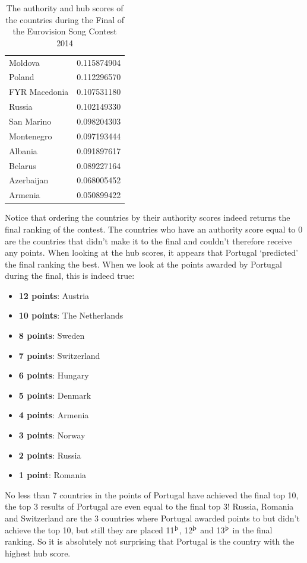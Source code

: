 \documentclass[a4paper,11pt]{report}
\begin{document}
\begin{table}[h!]
\begin{tabular}{l|r}
Moldova         & 0.115874904 \\
Poland          & 0.112296570  \\
FYR Macedonia   & 0.107531180  \\
Russia          & 0.102149330  \\
San Marino      & 0.098204303 \\
Montenegro      & 0.097193444 \\
Albania         & 0.091897617 \\
Belarus         & 0.089227164 \\
Azerbaijan      & 0.068005452 \\
Armenia         & 0.050899422
\end{tabular}

\caption{The authority and hub scores of the countries during the Final of the Eurovision Song Contest 2014}
\end{table}\label{t2014}

Notice that ordering the countries by their authority scores indeed returns the final ranking of the contest. The countries who have an
authority score equal to 0 are the countries that didn't make it to the final and couldn't therefore 
receive any points. When looking at the hub scores, it appears that Portugal `predicted' the 
final ranking the best. When we look at the points awarded by Portugal during 
the final, this is indeed true:
\begin{itemize}
  \itemsep0em

  \item \textbf{12 points}: Austria
\item \textbf{10 points}: The Netherlands
\item \textbf{8 points}: Sweden
\item \textbf{7 points}: Switzerland	
\item \textbf{6 points}: Hungary
\item \textbf{5 points}: Denmark
\item \textbf{4 points}: Armenia	
\item \textbf{3 points}: Norway
\item \textbf{2 points}: Russia
\item \textbf{1 point}: Romania
\end{itemize}
No less than 7 countries in the points of Portugal have achieved the final top 
10, the top 3 results of Portugal are even equal to the final top 3! Russia, Romania and
Switzerland are the 3 countries where Portugal awarded points to but didn't achieve the 
top 10, but still they are placed 11$^\text{\th}$, 12$^\text{\th}$ and 
13$^\text{\th}$ in the final ranking. So it is absolutely not surprising that Portugal is the country 
with the highest hub score. 
\end{document}
